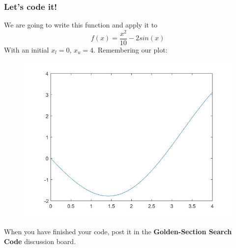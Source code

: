 \documentclass{if-beamer}
\begin{document}
\begin{frame}
	\frametitle{Let's code it!}
	We are going to write this function and apply it to
	$$f(x) = \frac{x^2}{10}-2sin(x)$$
	With an initial $x_l =0$, $x_u =4$. Remembering our plot:
	\begin{figure}
		\centering
		\includegraphics[width=.6\textwidth]{figures/plot}
	\end{figure}
	When you have finished your code, post it in the \textbf{Golden-Section Search Code} discussion board.
\end{frame}
\end{document}
